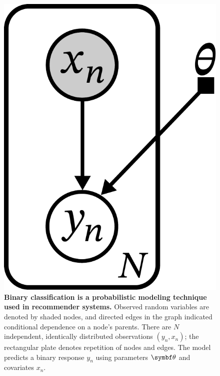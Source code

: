 \begin{figure}[t]
  \centering
  \includegraphics[height=0.2\paperheight]{fig/graphical-model-regression.pdf}
  \caption[Graphical model for logistic regression]{
  \textbf{Binary classification is a probabilistic modeling technique used in recommender systems.} Observed random variables are denoted by shaded nodes, and directed edges in the graph indicated conditional dependence on a node's parents. There are $N$ independent, identically distributed observations $(y_n, x_n)$; the rectangular plate denotes repetition of nodes and edges. The model predicts a binary response $y_n$ using parameters $\mbtheta$ and covariates $x_n$.}
  \label{fig:graphical-model-regression}
\end{figure}